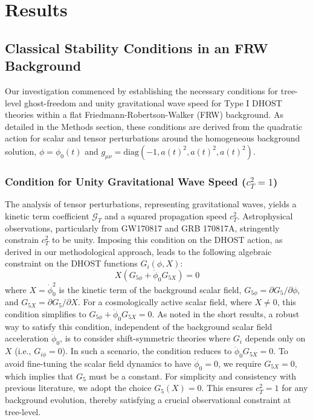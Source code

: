 \documentclass[twocolumn]{aastex631}
\begin{document}
\section{Results}
\label{sec:results}
\subsection{Classical Stability Conditions in an FRW Background}
Our investigation commenced by establishing the necessary conditions for tree-level ghost-freedom and unity gravitational wave speed for Type I DHOST theories within a flat Friedmann-Robertson-Walker (FRW) background. As detailed in the Methods section, these conditions are derived from the quadratic action for scalar and tensor perturbations around the homogeneous background solution, $\phi=\phi_0(t)$ and $g_{\mu\nu} = \text{diag}(-1, a(t)^2, a(t)^2, a(t)^2)$.

\subsubsection{Condition for Unity Gravitational Wave Speed ($c_T^2=1$)}
The analysis of tensor perturbations, representing gravitational waves, yields a kinetic term coefficient $\mathcal{G}_T$ and a squared propagation speed $c_T^2$. Astrophysical observations, particularly from GW170817 and GRB 170817A, stringently constrain $c_T^2$ to be unity. Imposing this condition on the DHOST action, as derived in our methodological approach, leads to the following algebraic constraint on the DHOST functions $G_i(\phi, X)$:
\begin{equation}
X(G_{5\phi} + \ddot{\phi}_0 G_{5X}) = 0
\end{equation}
where $X = \dot{\phi}_0^2$ is the kinetic term of the background scalar field, $G_{5\phi} = \partial G_5 / \partial \phi$, and $G_{5X} = \partial G_5 / \partial X$. For a cosmologically active scalar field, where $X \neq 0$, this condition simplifies to $G_{5\phi} + \ddot{\phi}_0 G_{5X} = 0$. As noted in the short results, a robust way to satisfy this condition, independent of the background scalar field acceleration $\ddot{\phi}_0$, is to consider shift-symmetric theories where $G_i$ depends only on $X$ (i.e., $G_{i\phi}=0$). In such a scenario, the condition reduces to $\ddot{\phi}_0 G_{5X} = 0$. To avoid fine-tuning the scalar field dynamics to have $\ddot{\phi}_0=0$, we require $G_{5X}=0$, which implies that $G_5$ must be a constant. For simplicity and consistency with previous literature, we adopt the choice $G_5(X) = 0$. This ensures $c_T^2=1$ for any background evolution, thereby satisfying a crucial observational constraint at tree-level.
\end{document}

